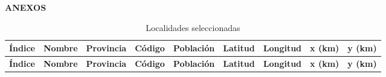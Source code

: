 
\begin{center}

{\fontsize{12pt}{14pt}\selectfont\textbf{ANEXOS}}

\end{center}

\begin{longtable}{|c|l|l|c|r|r|r|r|r|}
\caption{Localidades seleccionadas}
\label{tab:localidades} \\

\hline
\textbf{Índice} & \textbf{Nombre} & \textbf{Provincia} & \textbf{Código} & \textbf{Población} & \textbf{Latitud} & \textbf{Longitud} & \textbf{x (km)} & \textbf{y (km)} \\ \hline
\endfirsthead

\hline
\textbf{Índice} & \textbf{Nombre} & \textbf{Provincia} & \textbf{Código} & \textbf{Población} & \textbf{Latitud} & \textbf{Longitud} & \textbf{x (km)} & \textbf{y (km)} \\ \hline
\endhead


\end{longtable}
